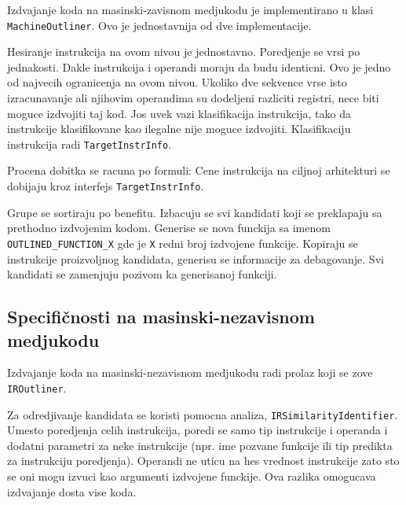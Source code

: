 \documentclass[12pt,oneside]{memoir}
\begin{document}
Izdvajanje koda na masinski-zavisnom medjukodu je implementirano u klasi \verb|MachineOutliner|.
Ovo je jednostavnija od dve implementacije.

Hesiranje instrukcija na ovom nivou je jednostavno.
Poredjenje se vrsi po jednakosti.
Dakle instrukcija i operandi moraju da budu identicni.
Ovo je jedno od najvecih ogranicenja na ovom nivou.
Ukoliko dve sekvence vrse isto izracunavanje ali njihovim operandima su dodeljeni razliciti registri, nece biti moguce izdvojiti taj kod.
Jos uvek vazi klasifikacija instrukcija, tako da instrukcije klasifikovane kao ilegalne nije moguce izdvojiti.
Klasifikaciju instrukcija radi \verb|TargetInstrInfo|.

Procena dobitka se racuna po formuli:
Cene instrukcija na ciljnoj arhitekturi se dobijaju kroz interfejs \verb|TargetInstrInfo|.

Grupe se sortiraju po benefitu.
Izbacuju se svi kandidati koji se preklapaju sa prethodno izdvojenim kodom.
Generise se nova funckija sa imenom \verb|OUTLINED_FUNCTION_X| gde je \verb|X| redni broj izdvojene funkcije.
Kopiraju se instrukcije proizvoljnog kandidata, generisu se informacije za debagovanje.
Svi kandidati se zamenjuju pozivom ka generisanoj funkciji.

\subsection{Specifičnosti na masinski-nezavisnom medjukodu}


Izdvajanje koda na masinski-nezavisnom medjukodu radi prolaz koji se zove \verb|IROutliner|.

Za odredjivanje kandidata se koristi pomocna analiza, \verb|IRSimilarityIdentifier|.
Umesto poredjenja celih instrukcija, poredi se samo tip instrukcije i operanda i dodatni parametri za neke instrukcije (npr. ime pozvane funkcije ili tip predikta za instrukciju poredjenja).
Operandi ne uticu na hes vrednost instrukcije zato sto se oni mogu izvuci kao argumenti izdvojene funckije.
Ova razlika omogucava izdvajanje dosta vise koda.
\end{document}
